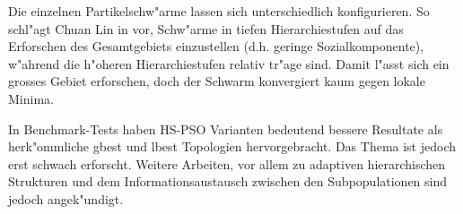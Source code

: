 Die einzelnen Partikelschw"arme lassen sich unterschiedlich
konfigurieren. So schl"agt Chuan Lin in \cite{ChuanLin-HSPSO} vor,
Schw"arme in tiefen Hierarchiestufen auf das Erforschen des Gesamtgebiets
einzustellen (d.h. geringe Sozialkomponente), w"ahrend die h"oheren
Hierarchiestufen relativ tr"age sind. Damit l"asst sich ein grosses Gebiet
erforschen, doch der Schwarm konvergiert kaum gegen lokale Minima.

In Benchmark-Tests haben HS-PSO Varianten bedeutend bessere Resultate als
herk"ommliche gbest und lbest Topologien hervorgebracht. Das Thema ist
jedoch erst schwach erforscht. Weitere Arbeiten, vor allem zu adaptiven
hierarchischen Strukturen und dem Informationsaustausch zwischen den
Subpopulationen sind jedoch angek"undigt.

